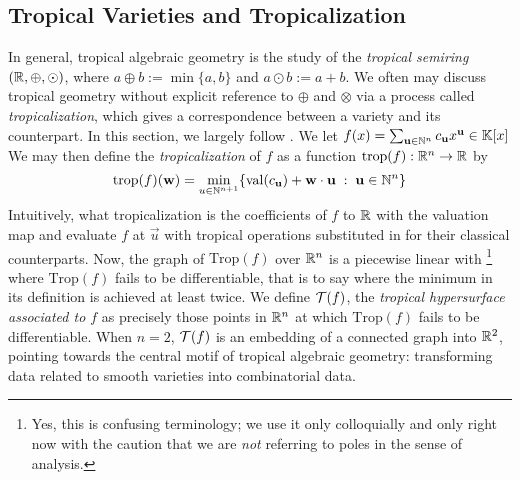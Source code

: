 \documentclass[12pt,letter]{article}
\newcommand{\trop}{\mathrm{Trop}}
\begin{document}
\subsection{Tropical Varieties and Tropicalization}
\label{deftrop}
In general, tropical algebraic geometry is the study of the \emph{tropical semiring} $({\mathbb R},\oplus,\odot)$, where $a\oplus b:=\min\{a,b\}$ and $a\odot b:=a+b$. We often may discuss tropical geometry without explicit reference to $\oplus$ and $\otimes$ via a process called \emph{tropicalization}, which gives a correspondence between a variety and its  counterpart. In this section, we largely follow \cite[\S3]{MaSt15}. 
 We let $f(x)=\sum_{\mathbf{u}\in {\mathbb N}^{n}}c_{\mathbf{u}}x^{\mathbf{u}}\in {\mathbb K}[x]$ We may then define the \emph{tropicalization} of $f$ as a function $\mathrm{trop}(f):{\mathbb R}^{n}\to {\mathbb R}$ by \begin{equation} \mathrm{trop}(f)(\mathbf{w})=\min_{u\in {\mathbb N}^{n+1}} \{\mathrm{val}(c_{\mathbf{u}})+\mathbf{w}\cdot\mathbf{u}\;:\;\mathbf{u}\in {\mathbb N}^{n}\}
\end{equation}
Intuitively, what tropicalization  is  the coefficients of $f$ to ${\mathbb R}$ with the valuation map and evaluate $f$ at $\vec{u}$ with tropical operations substituted in for their classical counterparts. Now, the graph of $\trop(f)$ over ${\mathbb R}^{n}$ is a piecewise linear  with \footnote{Yes, this is confusing terminology; we use it only colloquially and only right now with the caution that we are \emph{not} referring to poles in the sense of analysis.} where $\trop(f)$ fails to be differentiable, that is to say where the minimum in its definition is achieved at least twice. We define ${\mathcal T}(f)$, the \emph{tropical hypersurface associated to $f$} as precisely those points in ${\mathbb R}^{n}$ at which $\trop(f)$ fails to be differentiable. When $n=2$, ${\mathcal T}(f)$ is an embedding of a connected graph into ${\mathbb R}^2$, pointing towards the central motif of tropical algebraic geometry: transforming data related to smooth varieties into combinatorial data.
\end{document}
